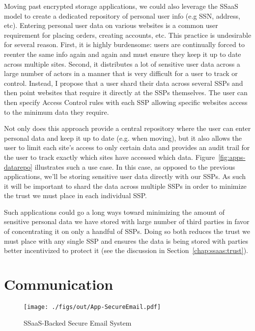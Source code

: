 Moving past encrypted storage applications, we could also leverage the
SSaaS model to create a dedicated repository of personal user info
(e.g SSN, address, etc). Entering personal user data on various
websites is a common user requirement for placing orders, creating
accounts, etc. This practice is undesirable for several reason. First,
it is highly burdensome: users are continually forced to reenter the
same info again and again and must ensure they keep it up to date
across multiple sites. Second, it distributes a lot of sensitive user
data across a large number of actors in a manner that is very
difficult for a user to track or control. Instead, I propose that a
user shard their data across several SSPs and then point websites that
require it directly at the SSPs themselves. The user can then specify
Access Control rules with each SSP allowing specific websites access
to the minimum data they require.

Not only does this approach provide a central repository where the
user can enter personal data and keep it up to date (e.g. when
moving), but it also allows the user to limit each site's access to
only certain data and provides an audit trail for the user to track
exactly which sites have accessed which
data. Figure~\ref{fig:apps-datarepo} illustrates such a use case. In
this case, as opposed to the previous applications, we'll be storing
sensitive user data directly with our SSPs. As such it will be
important to shard the data across multiple SSPs in order to minimize
the trust we must place in each individual SSP.

Such applications could go a long ways toward minimizing the amount of
sensitive personal data we have stored with large number of third
parties in favor of concentrating it on only a handful of SSPs. Doing
so both reduces the trust we must place with any single SSP and
ensures the data is being stored with parties better incentivized to
protect it (see the discussion in Section~\ref{chap:ssaas:trust}).

\section{Communication}

\begin{figure}[t]
  \centering
  \texttt{[image: ./figs/out/App-SecureEmail.pdf]}
  \caption{SSaaS-Backed Secure Email System}
  \label{fig:apps-secureemail}
\end{figure}

